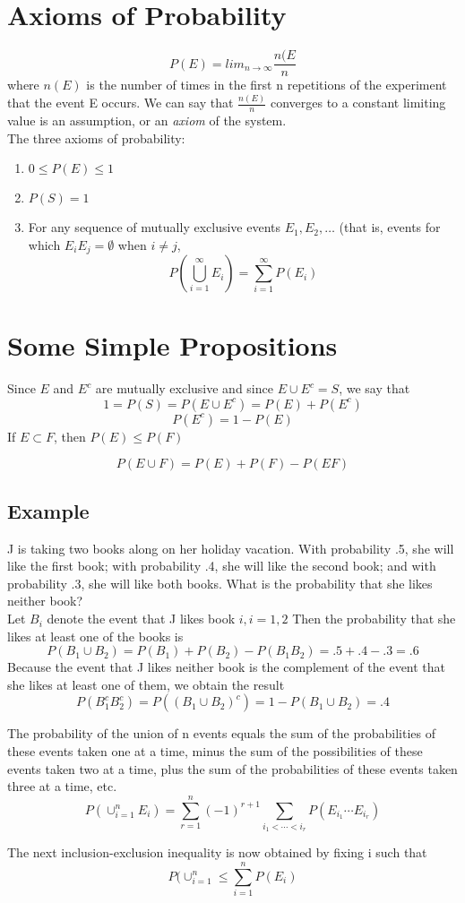 \section{Axioms of Probability}
$$P(E) = lim_{n\rightarrow\infty} \frac{n(E}{n}$$
where $n(E)$ is the number of times in the first n repetitions of the experiment that the event E occurs. We can say that $\frac{n(E)}{n}$ converges to a constant limiting value is an assumption, or an \textit{axiom} of the system. \\
The three axioms of probability:
\begin{enumerate}
    \item $0\leq P(E)\leq 1$
    \item $P(S) = 1$
    \item For any sequence of mutually exclusive events $E_1, E_2, \dots$ (that is, events for which $E_iE_j = \emptyset$ when $i\neq j$, \[P\left(\bigcup_{i=1}^\infty E_i\right) = \sum_{i=1}^\infty P(E_i)\]
\end{enumerate}
\section{Some Simple Propositions}
Since $E$ and $E^c$ are mutually exclusive and since $E\cup E^c = S$, we say that \[1 = P(S) = P(E\cup E^c) = P(E)+P(E^c)\] \[P(E^c) = 1-P(E)\]
If $E\subset F$, then $P(E)\leq P(F)$
\begin{definition}
    \[P(E\cup F) = P(E)+P(F)-P(EF)\]
\end{definition}
\subsection*{Example}
J is taking two books along on her holiday vacation. With probability .5, she will
like the first book; with probability .4, she will like the second book; and with
probability .3, she will like both books. What is the probability that she likes
neither book?\\
Let $B_i$ denote the event that J likes book $i, i = 1,2$ Then the probability that she
likes at least one of the books is \[P(B_1\cup B_2) = P(B_1)+P(B_2) - P(B_1B_2) = .5 + .4 -.3 = .6\]
Because the event that J likes neither book is the complement of the event that
she likes at least one of them, we obtain the result \[P(B_1^cB_2^c) = P((B_1\cup B_2)^c) = 1 - P(B_1\cup B_2) = .4\]
\begin{definition}
    The probability of the union of n events equals the sum of the probabilities of these events taken one at a time, minus the sum of the possibilities of these events taken two at a time, plus the sum of the probabilities of these events taken three at a time, etc. \[P(\cup^n_{i=1} E_i) = \sum^n_{r=1} (-1)^{r+1} \sum_{i_1 < \cdots < i_r} P(E_{i_1}\cdots E_{i_r})\]
\end{definition}
\begin{definition}
    The next inclusion-exclusion inequality is now obtained by fixing i such that
    \[P(\cup^n_{i=1} \leq \sum^n_{i=1} P(E_i)\]
\end{definition}
